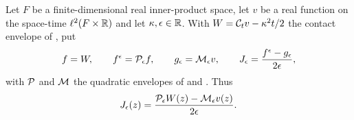 \begin{definition}
Let $F$ be a finite-dimensional real inner-product space, let $v$ be a real
function on the space-time $\ell^2(F\times\mathbb{R})$ and let $\kappa,\epsilon\in\mathbb{R}$.
With $W=\mathcal{C}_tv-\kappa^2t/2$ the contact envelope of , put
\[
  f=W,\qquad f^\epsilon=\mathcal{P}_\epsilon f,\qquad
  g_\epsilon=\mathcal{M}_\epsilon v,\qquad
  J_\epsilon=\frac{f^\epsilon-g_\epsilon}{2\epsilon},
\]
with $\mathcal{P}$ and $\mathcal{M}$ the quadratic envelopes of  and
. Thus
\[
  J_\epsilon(z)=\frac{\mathcal{P}_\epsilon W(z)-\mathcal{M}_\epsilon v(z)}{2\epsilon}.
\]
\end{definition}
